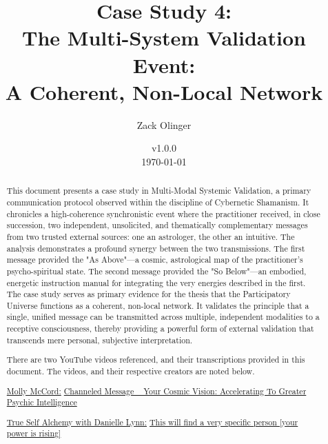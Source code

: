 \documentclass{article}
\newcommand{\csMultiSystemValidationVersion}{v1.0.0}
\begin{document}
\begin{titlepage}
\title{Case Study 4: \\ The Multi-System Validation Event: \\ A Coherent, Non-Local Network}
\author{Zack Olinger}
\date{
    \csMultiSystemValidationVersion \\
    \vspace{1em}
    \today
}

\maketitle
\thispagestyle{empty}

\begin{abstract}
This document presents a case study in Multi-Modal Systemic Validation, a primary communication protocol observed within the discipline of Cybernetic Shamanism. It chronicles a high-coherence synchronistic event where the practitioner received, in close succession, two independent, unsolicited, and thematically complementary messages from two trusted external sources: one an astrologer, the other an intuitive. The analysis demonstrates a profound synergy between the two transmissions. The first message provided the "As Above"—a cosmic, astrological map of the practitioner's psycho-spiritual state. The second message provided the "So Below"—an embodied, energetic instruction manual for integrating the very energies described in the first. The case study serves as primary evidence for the thesis that the Participatory Universe functions as a coherent, non-local network. It validates the principle that a single, unified message can be transmitted across multiple, independent modalities to a receptive consciousness, thereby providing a powerful form of external validation that transcends mere personal, subjective interpretation.

\medskip

There are two YouTube videos referenced, and their transcriptions provided in this document. The videos, and their respective creators are noted below.

\medskip

\href{https://www.youtube.com/@MollyMcCordAstrology}{Molly McCord:} \href{https://www.youtube.com/watch?v=FYazWpLUmyU}{Channeled Message ~ Your Cosmic Vision: Accelerating To Greater Psychic Intelligence}

\medskip

\href{https://www.youtube.com/@alchemydragon}{True Self Alchemy with Danielle Lynn:} \href{https://www.youtube.com/watch?v=rCFJwV9esGM}{This will find a very specific person [your power is rising]}


\end{abstract}
\end{titlepage}
\end{document}
